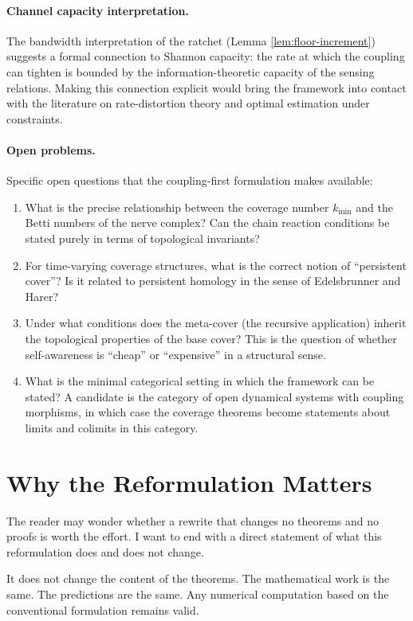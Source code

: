 \documentclass[11pt]{article}
\theoremstyle{definition}
\theoremstyle{remark}
\begin{document}
\paragraph{Channel capacity interpretation.} The bandwidth interpretation of the ratchet (Lemma \ref{lem:floor-increment}) suggests a formal connection to Shannon capacity: the rate at which the coupling can tighten is bounded by the information-theoretic capacity of the sensing relations. Making this connection explicit would bring the framework into contact with the literature on rate-distortion theory and optimal estimation under constraints.

\paragraph{Open problems.} Specific open questions that the coupling-first formulation makes available:
\begin{enumerate}
\item What is the precise relationship between the coverage number $k_{\min}$ and the Betti numbers of the nerve complex? Can the chain reaction conditions be stated purely in terms of topological invariants?
\item For time-varying coverage structures, what is the correct notion of ``persistent cover''? Is it related to persistent homology in the sense of Edelsbrunner and Harer?
\item Under what conditions does the meta-cover (the recursive application) inherit the topological properties of the base cover? This is the question of whether self-awareness is ``cheap'' or ``expensive'' in a structural sense.
\item What is the minimal categorical setting in which the framework can be stated? A candidate is the category of open dynamical systems with coupling morphisms, in which case the coverage theorems become statements about limits and colimits in this category.
\end{enumerate}

\section{Why the Reformulation Matters}

The reader may wonder whether a rewrite that changes no theorems and no proofs is worth the effort. I want to end with a direct statement of what this reformulation does and does not change.

It does not change the content of the theorems. The mathematical work is the same. The predictions are the same. Any numerical computation based on the conventional formulation remains valid.
\end{document}
